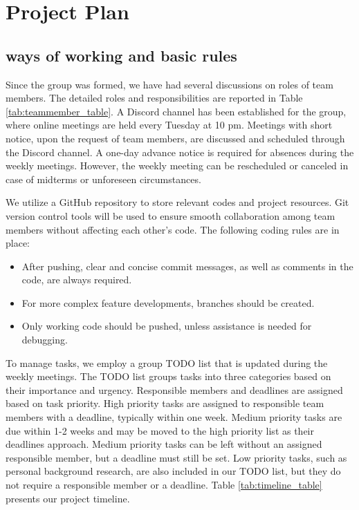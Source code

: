 \documentclass{article} %
\begin{document}



\section{Project Plan}

\subsection{ways of working and basic rules}
Since the group was formed, we have had several discussions on roles of team members. The detailed roles and responsibilities are reported in Table \ref{tab:teammember_table}. A Discord channel has been established for the group, where online meetings are held every Tuesday at 10 pm. Meetings with short notice, upon the request of team members, are discussed and scheduled through the Discord channel. A one-day advance notice is required for absences during the weekly meetings. However, the weekly meeting can be rescheduled or canceled in case of midterms or unforeseen circumstances.

We utilize a GitHub repository to store relevant codes and project resources. Git version control tools will be used to ensure smooth collaboration among team members without affecting each other's code. The following coding rules are in place:
\begin{itemize}
  \item After pushing, clear and concise commit messages, as well as comments in the code, are always required.
  \item For more complex feature developments, branches should be created.
  \item Only working code should be pushed, unless assistance is needed for debugging.

\end{itemize}

To manage tasks, we employ a group TODO list that is updated during the weekly meetings. The TODO list groups tasks into three categories based on their importance and urgency. Responsible members and deadlines are assigned based on task priority. High priority tasks are assigned to responsible team members with a deadline, typically within one week. Medium priority tasks are due within 1-2 weeks and may be moved to the high priority list as their deadlines approach. Medium priority tasks can be left without an assigned responsible member, but a deadline must still be set. Low priority tasks, such as personal background research, are also included in our TODO list, but they do not require a responsible member or a deadline. Table \ref{tab:timeline_table} presents our project timeline.
\end{document}
